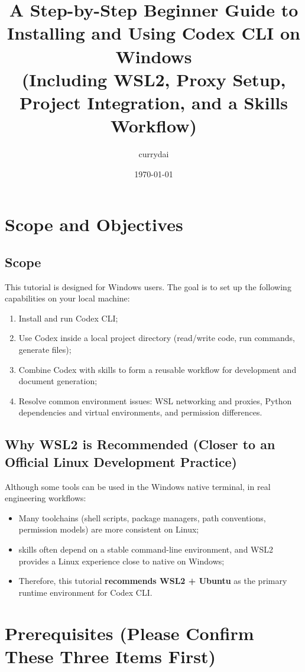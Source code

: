 \documentclass[11pt,a4paper]{article}
\title{A Step-by-Step Beginner Guide to Installing and Using Codex CLI on Windows\\(Including WSL2, Proxy Setup, Project Integration, and a Skills Workflow)}
\author{currydai}
\date{\today}
\begin{document}
\maketitle
\newpage

\section{Scope and Objectives}
\subsection{Scope}
This tutorial is designed for Windows users. The goal is to set up the following capabilities on your local machine:
\begin{enumerate}[leftmargin=1.7em]
  \item Install and run Codex CLI;
  \item Use Codex inside a local project directory (read/write code, run commands, generate files);
  \item Combine Codex with skills to form a reusable workflow for development and document generation;
  \item Resolve common environment issues: WSL networking and proxies, Python dependencies and virtual environments, and permission differences.
\end{enumerate}

\subsection{Why WSL2 is Recommended (Closer to an Official Linux Development Practice)}
Although some tools can be used in the Windows native terminal, in real engineering workflows:
\begin{itemize}[leftmargin=1.5em]
  \item Many toolchains (shell scripts, package managers, path conventions, permission models) are more consistent on Linux;
  \item skills often depend on a stable command-line environment, and WSL2 provides a Linux experience close to native on Windows;
  \item Therefore, this tutorial \textbf{recommends WSL2 + Ubuntu} as the primary runtime environment for Codex CLI.
\end{itemize}

\section{Prerequisites (Please Confirm These Three Items First)}
\end{document}
